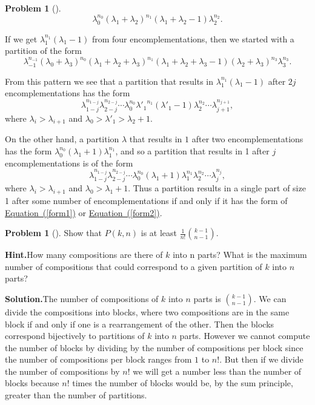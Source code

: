 \documentclass[10pt,]{book}
\theoremstyle{plain}
\theoremstyle{definition}
\newtheorem{activity}[project]{Problem}
\theoremstyle{definition}
\numberwithin{equation}{chapter}
\begin{document}
\begin{activity}[]
\begin{equation*}
\lambda_0^{n_0}(\lambda_1+\lambda_{2})^{n_1}(\lambda_1+
\lambda_2-1)\lambda_2^{n_2}.
\end{equation*}
%
\par
If we get \(\lambda_1^{n_1}(\lambda_1-1)\) from four encomplementations, then we started with a partition of the form%
\begin{equation*}
\lambda_{-1}^{n_{-1}}(\lambda_0+\lambda_{3})^{n_0}(\lambda_1+
\lambda_2 +
\lambda_{3})^{n_1}(\lambda_1+\lambda_2 +\lambda_3-1)(\lambda_2+
\lambda_{3})^{n_3}
\lambda_3^{n_3}.
\end{equation*}
%
\par
From this pattern we see that a partition that results in \(\lambda_1^{n_1}(\lambda_1-1)\) after \(2j\) encomplementations has the form%
\begin{equation}
\lambda_{1-j}^{n_{1-j}}\lambda_{2-j}^{n_{2-j}}\cdots
\lambda_0^{n_0}
{\lambda'_1}^{n_1}
(\lambda'_1-1)\lambda_2^{n_2}\cdots
\lambda_{j+1}^{n_{j+1}},\label{form1}
\end{equation}
where \(\lambda_i>\lambda_{i+1}\) and \(\lambda_0>\lambda'_1>\lambda_2+1\).%
\par
On the other hand, a partition \(\lambda\) that results in \(1\) after two encomplementations has the form \(\lambda_0^{n_0}(\lambda_1+1)\lambda_1^{n_1}\), and so a partition that results in 1 after \(j\) encomplementations is of the form%
\begin{equation}
\lambda_{1-j}^{n_{1-j}}\lambda_{2-j}^{n_{2-j}}\cdots
\lambda_0^{n_0}(\lambda_1+1)\lambda_1^{n_1}\lambda_2^{n_2}\cdots
\lambda_j^{n_j},\label{form2}
\end{equation}
where \(\lambda_i>\lambda_{i+1}\) and \(\lambda_0>\lambda_1+1\). Thus a partition results in a single part of size 1 after some number of encomplementations if and only if it has the form of \hyperref[form1]{Equation~(\ref{form1})} or \hyperref[form2]{Equation~(\ref{form2})}.%
\end{activity}
\begin{activity}[]\label{activity-170}
Show that \(P(k,n)\) is at least \(\frac{1}{n!}\binom{k-1}{n-1}\).%
\par\medskip\noindent%
\textbf{Hint.}\quad How many compositions are there of \(k\) into n parts? What is the maximum number of compositions that could correspond to a given partition of \(k\) into \(n\) parts?%
\par\medskip\noindent%
\textbf{Solution.}\quad The number of compositions of \(k\) into \(n\) parts is \(\binom{k-1}{n-1}\). We can divide the compositions into blocks, where two compositions are in the same block if and only if one is a rearrangement of the other. Then the blocks correspond bijectively to partitions of \(k\) into \(n\) parts. However we cannot compute the number of blocks by dividing by the number of compositions per block since the number of compositions per block ranges from \(1\) to \(n!\).  But then if we divide the number of compositions by \(n!\) we will get a number less than the number of blocks because \(n!\) times the number of blocks would be, by the sum principle, greater than the number of partitions.%
\end{activity}
\end{document}
